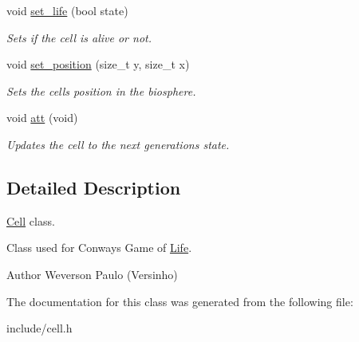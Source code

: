 \begin{DoxyCompactItemize}
\mbox{\label{classCell_a011c0daa4bedab842db7e5dee0520bae}} 
void \hyperlink{classCell_a011c0daa4bedab842db7e5dee0520bae}{set\+\_\+life} (bool state)
\begin{DoxyCompactList}\small\item\em Sets if the cell is alive or not. \end{DoxyCompactList}\item 
\mbox{\label{classCell_a0a9544f86704834306f5064b5fcae65f}} 
void \hyperlink{classCell_a0a9544f86704834306f5064b5fcae65f}{set\+\_\+position} (size\+\_\+t y, size\+\_\+t x)
\begin{DoxyCompactList}\small\item\em Sets the cell\textquotesingle{}s position in the biosphere. \end{DoxyCompactList}\item 
\mbox{\label{classCell_ad55907754821a3831a2c89e86367ebf4}} 
void \hyperlink{classCell_ad55907754821a3831a2c89e86367ebf4}{att} (void)
\begin{DoxyCompactList}\small\item\em Updates the cell to the next generation\textquotesingle{}s state. \end{DoxyCompactList}\end{DoxyCompactItemize}


\subsection{Detailed Description}
\hyperlink{classCell}{Cell} class. 

Class used for Conway\textquotesingle{}s Game of \hyperlink{classLife}{Life}. \begin{DoxyAuthor}{Author}
Weverson Paulo (Versinho) 
\end{DoxyAuthor}


The documentation for this class was generated from the following file\+:\begin{DoxyCompactItemize}
\item 
include/cell.\+h\end{DoxyCompactItemize}
